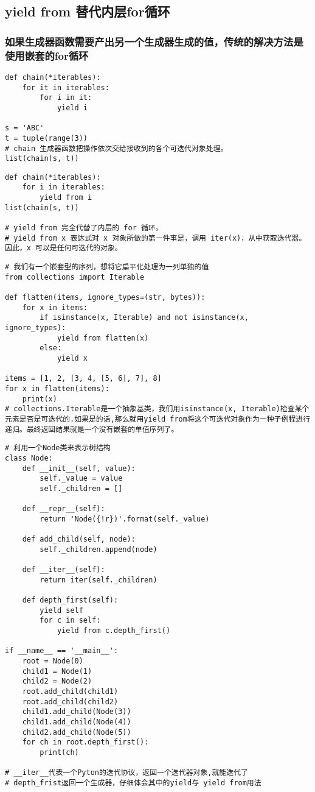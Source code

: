 \documentclass[11pt]{article}
\begin{document}
\subsection{yield from 替代内层for循环}
\label{sec:orge526916}
\subsubsection{如果生成器函数需要产出另一个生成器生成的值，传统的解决方法是使用嵌套的for循环}
\label{sec:org74b0a4d}
\begin{verbatim}
def chain(*iterables):
    for it in iterables:
        for i in it:
            yield i

s = 'ABC'
t = tuple(range(3))
# chain 生成器函数把操作依次交给接收到的各个可迭代对象处理。
list(chain(s, t))
\end{verbatim}
\begin{verbatim}
def chain(*iterables):
    for i in iterables:
        yield from i
list(chain(s, t))

# yield from 完全代替了内层的 for 循环。
# yield from x 表达式对 x 对象所做的第一件事是，调用 iter(x)，从中获取迭代器。因此，x 可以是任何可迭代的对象。

\end{verbatim}

\begin{verbatim}
# 我们有一个嵌套型的序列，想将它扁平化处理为一列单独的值
from collections import Iterable

def flatten(items, ignore_types=(str, bytes)):
    for x in items:
        if isinstance(x, Iterable) and not isinstance(x, ignore_types):
            yield from flatten(x)
        else:
            yield x

items = [1, 2, [3, 4, [5, 6], 7], 8]
for x in flatten(items):
    print(x)
# collections.Iterable是一个抽象基类，我们用isinstance(x, Iterable)检查某个元素是否是可迭代的.如果是的话,那么就用yield from将这个可迭代对象作为一种子例程进行递归。最终返回结果就是一个没有嵌套的单值序列了。    
\end{verbatim}

\begin{verbatim}
# 利用一个Node类来表示树结构
class Node:
    def __init__(self, value):
        self._value = value
        self._children = []

    def __repr__(self):
        return 'Node({!r})'.format(self._value)

    def add_child(self, node):
        self._children.append(node)

    def __iter__(self):
        return iter(self._children)

    def depth_first(self):
        yield self
        for c in self:
            yield from c.depth_first()

if __name__ == '__main__':
    root = Node(0)
    child1 = Node(1)
    child2 = Node(2)
    root.add_child(child1)
    root.add_child(child2)
    child1.add_child(Node(3))
    child1.add_child(Node(4))
    child2.add_child(Node(5))
    for ch in root.depth_first():
        print(ch)

# __iter__代表一个Pyton的迭代协议，返回一个迭代器对象,就能迭代了
# depth_frist返回一个生成器，仔细体会其中的yield与 yield from用法        
\end{verbatim}
\end{document}
